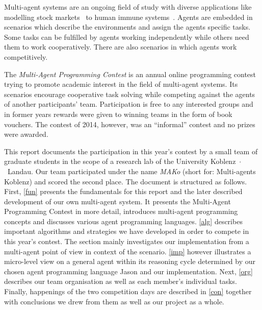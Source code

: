 Multi-agent systems are an ongoing field of study with diverse applications like modelling stock markets~\cite{lebaron_building_2002} to human immune systems~\cite{folcik_basic_2007}.
Agents are embedded in scenarios which describe the environments and assign the agents specific tasks.
Some tasks can be fulfilled by agents working independently while others need them to work cooperatively.
There are also scenarios in which agents work competitively.

The \emph{Multi-Agent Programming Contest} is an annual online programming contest trying to promote academic interest in the field of multi-agent systems.
Its scenarios encourage cooperative task solving while competing against the agents of another participants' team.
Participation is free to any interested groups and in former years rewards were given to winning teams in the form of book vouchers.
The contest of 2014, however, was an \enquote{informal} contest and no prizes were awarded.

This report documents the participation in this year's contest by a small team of graduate students in the scope of a research lab of the University Koblenz~$\cdot$~Landau.
Our team participated under the name \emph{MAKo} (short for: Multi-agents Koblenz) and scored the second place.
The document is structured as follows.
First, \autoref{fun} presents the fundamentals for this report and the later described development of our own multi-agent system.
It presents the Multi-Agent Programming Contest in more detail, introduces multi-agent programming concepts and discusses various agent programming languages.
\autoref{alg} describes important algorithms and strategies we have developed in order to compete in this year's contest.
The section mainly investigates our implementation from a multi-agent point of view in context of the scenario.
\autoref{imp} however illustrates a micro-level view on a general agent within its reasoning cycle determined by our chosen agent programming language Jason and our implementation.
Next, \autoref{org} describes our team organisation as well as each member's individual tasks.
Finally, happenings of the two competition days are described in \autoref{con} together with conclusions we drew from them as well as our project as a whole.
